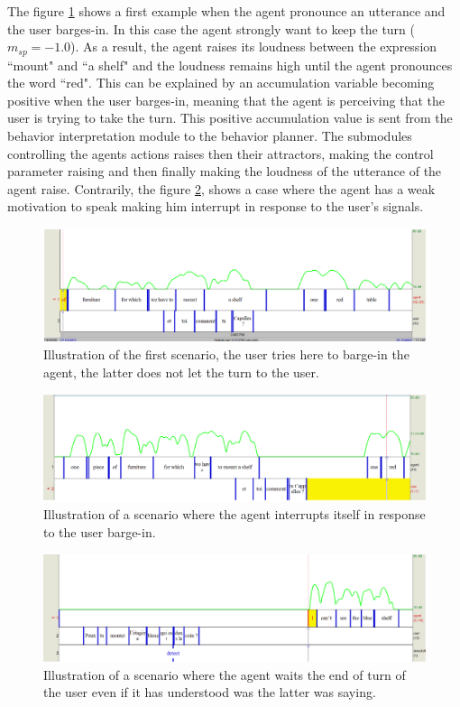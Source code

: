 The figure \ref{sc_1} shows a first example when the agent pronounce an utterance and the user barges-in. In this case the agent strongly want to keep the turn ($m_{sp}=-1.0$). As a result, the agent raises its loudness between the expression ``mount" and ``a shelf" and the loudness remains high until the agent pronounces the word ``red". This can be explained by an accumulation variable becoming positive when the user barges-in, meaning that the agent is perceiving that the user is trying to take the turn. This positive accumulation value is sent from the behavior interpretation module to the behavior planner. The submodules controlling the agents actions raises then their attractors, making the control parameter raising and then finally making the loudness of the utterance of the agent raise. Contrarily, the figure \ref{sc_2}, shows a case where the agent has a weak motivation to speak making him interrupt in response to the user's signals.

\begin{figure}
\centering
\includegraphics[width=\linewidth]{figure/volume_transcript_1_1.png}
\caption{Illustration of the first scenario, the user tries here to barge-in the agent, the latter does not let the turn to the user.}
\label{sc_1}
\end{figure}

\begin{figure}
\centering
\includegraphics[width=\linewidth]{figure/volume_transcript_1_2.png}
\caption{Illustration of a scenario where the agent interrupts itself in response to the user barge-in.}
\label{sc_2}
\end{figure}

\begin{figure}
\centering
\includegraphics[width=\linewidth]{figure/volume_transcript_2_2.png}
\caption{Illustration of a scenario where the agent waits the end of turn of the user even if it has understood was the latter was saying.}
\label{sc_3}
\end{figure}

